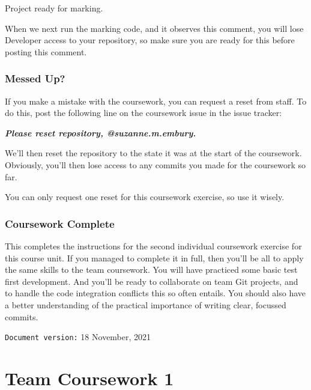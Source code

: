 \documentclass[
]{book}
\newenvironment{Shaded}{\begin{snugshade}}{\end{snugshade}}
\newcommand{\InformationTok}[1]{\textcolor[rgb]{0.56,0.35,0.01}{\textbf{\textit{#1}}}}
\newcommand{\NormalTok}[1]{#1}
\begin{document}
\begin{Shaded}
\begin{Highlighting}[]
\NormalTok{Project ready for marking.}
\end{Highlighting}
\end{Shaded}

When we next run the marking code, and it observes this comment, you will lose Developer access to your repository, so make sure you are ready for this before posting this comment.

\hypertarget{messi}{%
\subsection{Messed Up?}\label{messi}}

If you make a mistake with the coursework, you can request a reset from staff. To do this, post the following line on the coursework issue in the issue tracker:

\begin{Shaded}
\begin{Highlighting}[]
\InformationTok{    Please reset repository, @suzanne.m.embury.}
\end{Highlighting}
\end{Shaded}

We'll then reset the repository to the state it was at the start of the coursework. Obviously, you'll then lose access to any commits you made for the coursework so far.

You can only request one reset for this coursework exercise, so use it wisely.

\hypertarget{cw2fin}{%
\subsection{Coursework Complete}\label{cw2fin}}

This completes the instructions for the second individual coursework exercise for this course unit. If you managed to complete it in full, then you'll be all to apply the same skills to the team coursework. You will have practiced some basic test first development. And you'll be ready to collaborate on team Git projects, and to handle the code integration conflicts this so often entails. You should also have a better understanding of the practical importance of writing clear, focussed commits.

\texttt{Document\ version:} 18 November, 2021

\hypertarget{dealing}{%
\chapter{Team Coursework 1}\label{dealing}}
\end{document}
